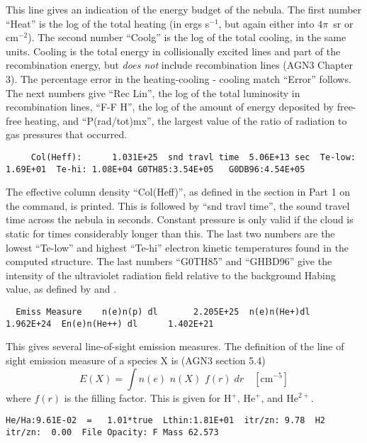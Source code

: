 This line gives an indication of the energy budget of the nebula.
The
first number ``Heat'' is the log of the total heating (in ergs s$^{-1}$, but
again either into $4\pi$~sr or cm$^{-2}$).
The second number ``Coolg'' is the log
of the total cooling, in the same units.
Cooling is the total energy in
collisionally excited lines and part of the recombination energy,
but \emph{does not} include recombination lines (AGN3 Chapter 3).
The percentage error
in the heating-cooling - cooling match ``Error'' follows.
The next numbers
give ``Rec Lin'', the log of the total luminosity in recombination lines,
``F-F  H'', the log of the amount of energy deposited by
free-free heating,
and ``P(rad/tot)mx'', the largest value of the ratio of
radiation to gas pressures that occurred.
{\setverbatimfontsize{\tiny}
\begin{verbatim}
     Col(Heff):      1.031E+25  snd travl time  5.06E+13 sec  Te-low: 1.69E+01  Te-hi: 1.08E+04 G0TH85:3.54E+05   G0DB96:4.54E+05
\end{verbatim}
}

The effective column density ``Col(Heff)'', as defined in the section
in Part 1 on the  command, is printed.
This is followed by ``snd travl time'',
the sound travel time across the nebula
in seconds.
Constant pressure is only valid if the cloud is static for
times considerably longer than this.
The last two numbers are the lowest
``Te-low'' and highest ``Te-hi'' electron kinetic temperatures found in
the computed structure.
The last numbers ``G0TH85'' and ``GHBD96'' give
the intensity of the ultraviolet radiation field relative to the background
Habing value, as defined by \citet{Tielens1985a} and \citet{Bertoldi1996}.
{\setverbatimfontsize{\tiny}
\begin{verbatim}
  Emiss Measure    n(e)n(p) dl       2.205E+25  n(e)n(He+)dl         1.962E+24  En(e)n(He++) dl      1.402E+21
\end{verbatim}
}

This gives several line-of-sight emission measures.
The definition of
the line of sight emission measure of a species X is
(AGN3 section 5.4)
\begin{equation}
E\left( X \right) = \int {n\left( e \right)} \,\,n\left( X
\right)\,\,f(r)\;dr\quad   [\mathrm{cm}^{-5}]%
\end{equation}
where $f(r)$ is the filling factor.  This is given for H$^+$, He$^+$, and
He$^{2+}$.
{\setverbatimfontsize{\tiny}
\begin{verbatim}
He/Ha:9.61E-02  =   1.01*true  Lthin:1.81E+01  itr/zn: 9.78  H2 itr/zn:  0.00  File Opacity: F Mass 62.573
\end{verbatim}
}

